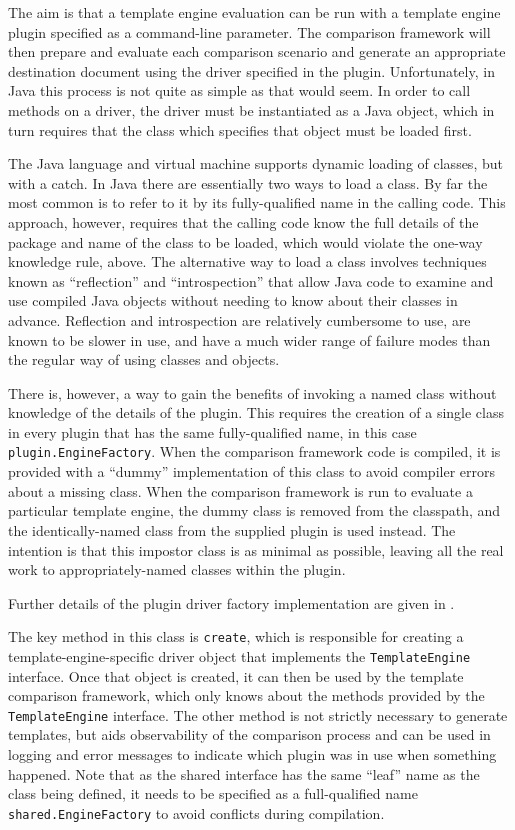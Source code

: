 The aim is that a \gls{template engine} evaluation can be run with a \gls{template engine} plugin specified as a command-line parameter. The comparison framework will then prepare and evaluate each comparison scenario and generate an appropriate destination document using the driver specified in the plugin. Unfortunately, in Java this process is not quite as simple as that would seem. In order to call methods on a driver, the driver must be instantiated as a Java object, which in turn requires that the class which specifies that object must be loaded first.

The Java language and virtual machine supports dynamic loading of classes, but with a catch. In Java there are essentially two ways to load a class. By far the most common is to refer to it by its fully-qualified name in the calling code. This approach, however, requires that the calling code know the full details of the package and name of the class to be loaded, which would violate the one-way knowledge rule, above. The alternative way to load a class involves techniques known as \enquote{reflection} and \enquote{introspection} that allow Java code to examine and use compiled Java objects without needing to know about their classes in advance. Reflection and introspection are relatively cumbersome to use, are known to be slower in use, and have a much wider range of failure modes than the regular way of using classes and objects.

There is, however, a way to gain the benefits of invoking a named class without knowledge of the details of the plugin. This requires the creation of a single class in every plugin that has the same fully-qualified name, in this case \verb!plugin.EngineFactory!. When the comparison framework code is compiled, it is provided with a \enquote{dummy} implementation of this class to avoid compiler errors about a missing class. When the comparison framework is run to evaluate a particular \gls{template engine}, the dummy class is removed from the \gls{classpath}, and the identically-named class from the supplied plugin is used instead. The intention is that this impostor class is as minimal as possible, leaving all the real work to appropriately-named classes within the plugin. 

Further details of the plugin driver factory implementation are given in .

The key method in this class is \verb!create!, which is responsible for creating a template-engine-specific driver object that implements the \verb!TemplateEngine! interface. Once that object is created, it can then be used by the template comparison framework, which only knows about the methods provided by the \verb!TemplateEngine! interface. The other method is not strictly necessary to generate templates, but aids observability of the comparison process and can be used in logging and error messages to indicate which plugin was in use when something happened. Note that as the shared interface has the same \enquote{leaf} name as the class being defined, it needs to be specified as a full-qualified name \verb!shared.EngineFactory! to avoid conflicts during compilation.

